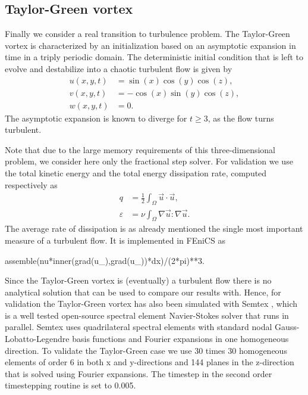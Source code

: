 \subsection{Taylor-Green vortex} 
Finally we consider a real transition to turbulence problem. The Taylor-Green vortex is characterized by an initialization based on an asymptotic expansion in time in a triply periodic domain. The deterministic initial condition that is left to evolve and destabilize into a chaotic turbulent flow is given by
\begin{align}
 u(x,y,t)&=\sin(x)\cos(y)\cos(z),\\
 v(x,y,t)&=-\cos(x)\sin(y)\cos(z),\\
 w(x,y,t)&=0.
\end{align}
The asymptotic expansion is known to diverge for $t \ge 3$, as the flow turns turbulent.

Note that due to the large memory requirements of this three-dimensional problem, we consider here only the fractional step solver. For validation we use the total kinetic energy and the total energy dissipation rate, computed respectively as
\begin{align}
 q &= \frac{1}{2} \int_{\Omega} \vec{u} \cdot \vec{u}, \label{eq:q} \\
 \varepsilon &= \nu \int_{\Omega} \nabla \vec{u}: \nabla \vec{u}. \label{eq:diss}
\end{align}
The average rate of dissipation is as already mentioned the single most important measure of a turbulent flow. It is implemented in FEniCS as
\begin{fenicscode}{0.9}
   assemble(nu*inner(grad(u_),grad(u_))*dx)/(2*pi)**3.
\end{fenicscode}

Since the Taylor-Green vortex is (eventually) a turbulent flow there is no analytical solution that can be used to compare our results with. Hence, for validation the Taylor-Green vortex has also been simulated with Semtex \cite{semtex}, which is a well tested open-source spectral element Navier-Stokes solver that runs in parallel. Semtex uses quadrilateral spectral elements with standard nodal Gauss-Lobatto-Legendre basis functions and Fourier expansions in one homogeneous direction. To validate the Taylor-Green case we use 30 times 30 homogeneous elements of order 6 in both x and y-directions and 144 planes in the z-direction that is solved using Fourier expansions. The timestep in the second order timestepping routine is set to 0.005.

